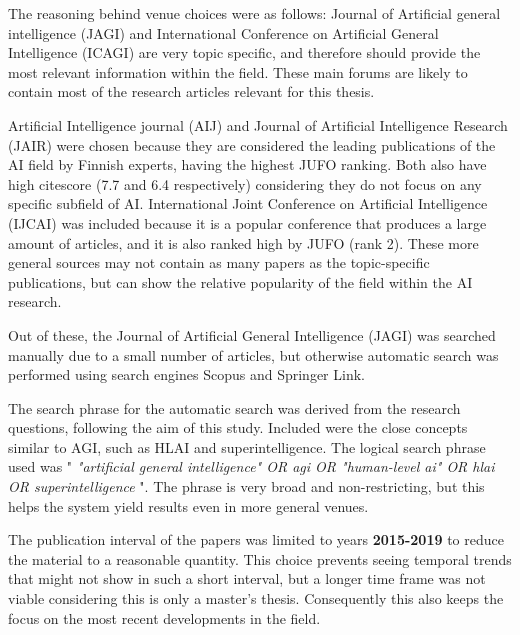 The reasoning behind venue choices were as follows: Journal of Artificial
general intelligence (JAGI) and International Conference on
Artificial General Intelligence (ICAGI) are very topic specific, and therefore
should provide the most relevant information within the field. These main forums
are likely to contain most of the research articles relevant for this thesis. 

Artificial Intelligence journal (AIJ) and Journal of Artificial Intelligence
Research (JAIR) were chosen because they are considered the leading publications
of the AI field by Finnish experts, having the highest JUFO ranking. Both also
have high citescore (7.7 and 6.4 respectively) considering they do not focus on
any specific subfield of AI. International Joint Conference on Artificial
Intelligence (IJCAI) was included because it is a popular conference that
produces a large amount of articles, and it is also ranked high by JUFO (rank
2). These more general sources may not contain as many papers as the
topic-specific publications, but can show the relative popularity of the field
within the AI research.


Out of these, the Journal of Artificial General Intelligence (JAGI) was searched
manually due to a small number of articles, but otherwise automatic search was
performed using search engines Scopus and Springer Link.

The search phrase for the automatic search was derived from the research
questions, following the aim of this study. Included were the close concepts
similar to AGI, such as HLAI and superintelligence. The logical search phrase
used was " \emph{"artificial general intelligence" OR agi OR "human-level ai" OR
hlai OR superintelligence} ". The phrase is very broad and non-restricting, but
this helps the system yield results even in more general venues.

The publication interval of the papers was limited to years \textbf{2015-2019}
to reduce the material to a reasonable quantity. This choice prevents seeing
temporal trends that might not show in such a short interval, but a longer time
frame was not viable considering this is only a master's thesis. Consequently
this also keeps the focus on the most recent developments in the field.

